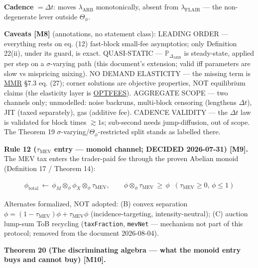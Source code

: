 \documentclass[11pt]{article}
\renewcommand{\_}{\textunderscore\allowbreak}
\begin{document}
\textbf{Cadence} \(= \Delta t\): moves \(\lambda_{\text{ARB}}\) monotonically, absent from \(\lambda_{\text{FLAIR}}\) --- the non-degenerate lever outside \(\Theta_{\phi}\).

\textbf{Caveats {[}M8{]}} (annotations, no statement class): LEADING ORDER --- everything rests on eq. (12) fast-block small-fee asymptotics; only Definition 22(ii), under its guard, is exact. QUASI-STATIC --- \(\mathbb{P}_{\Delta_{\text{ARB}}}\) is steady-state, applied per step on a \(\sigma\)-varying path (this document's extension; valid iff parameters are slow vs mispricing mixing). NO DEMAND ELASTICITY --- the missing term is \href{../refs/mev/MilionisMoallemiRoughgardenArbProfitsFees.pdf}{MMR} §7.3 eq. (27); corner solutions are objective properties, NOT equilibrium claims (the elasticity layer is \href{../refs/flair/CampbellBergaultMilionisNutzOptimalFees.pdf}{OPT\_FEES}). AGGREGATE SCOPE --- two channels only; unmodelled: noise backruns, multi-block censoring (lengthens \(\Delta t\)), JIT (taxed separately), gas (additive fee). CADENCE VALIDITY --- the \(\Delta t\) law is validated for block times \(\gtrsim 1\)s; sub-second needs jump-diffusion, out of scope. The Theorem 19 \(\sigma\)-varying/\(\Theta_{\phi}\)-restricted split stands as labelled there.

\textbf{Rule 12 (\(\tau_{\text{MEV}}\) entry --- monoid channel; DECIDED 2026-07-31) {[}M9{]}.} The MEV tax enters the trader-paid fee through the proven Abelian monoid (Definition 17 / Theorem 14):

\[
    \begin{aligned}
        \phi_{\text{total}} \, \leftarrow \, \phi_M \otimes_{\phi} \phi_X \otimes_{\phi} \tau_{\text{MEV}}, \qquad
        \phi \otimes_{\phi} \tau_{\text{MEV}} \, \geq \, \phi \;\; (\tau_{\text{MEV}} \geq 0,\, \phi \leq 1)
    \end{aligned}
\]

Alternates formalized, NOT adopted: (B) convex separation \(\phi = (1-\tau_{\text{MEV}})\phi + \tau_{\text{MEV}}\phi\) (incidence-targeting, intensity-neutral); (C) auction lump-sum ToB recycling (\texttt{taxFraction}, \texttt{mevNet} --- mechanism not part of this protocol; removed from the document 2026-08-04).

\textbf{Theorem 20 (The discriminating algebra --- what the monoid entry buys and cannot buy) {[}M10{]}.}
\end{document}
